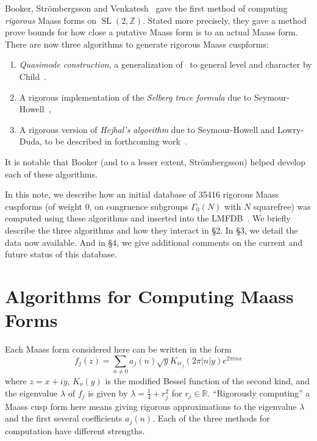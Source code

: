 \documentclass[11pt,reqno,oneside]{amsart}
\theoremstyle{plain}
\theoremstyle{definition}
\DeclareMathOperator{\SL}{SL}
\begin{document}
Booker, Str\"ombergsson and Venkatesh~\cite{booker2006effective} gave the first
method of computing \emph{rigorous} Maass forms on $\SL(2, \mathbb{Z})$.
Stated more precisely, they gave a method prove bounds for how close a putative
Maass form is to an actual Maass form.
There are now three algorithms to generate rigorous Maass cuspforms:
\begin{enumerate}
  \item \emph{Quasimode construction}, a generalization
  of~\cite{booker2006effective} to general level and character by
  Child~\cite{child22}.
  \item A rigorous implementation of the \emph{Selberg trace formula} due to
  Seymour-Howell~\cite{seymour2022rigorous},
  \item A rigorous version of \emph{Hejhal's algorithm} due to Seymour-Howell
  and Lowry-Duda, to be described in forthcoming work~\cite{ldshHejhal}.
\end{enumerate}
It is notable that Booker (and to a lesser extent, Str\"ombergsson) helped
develop each of these algorithms.

In this note, we describe how an initial database of 35416 rigorous Maass
cuspforms (of weight $0$, on congruence subgroups $\Gamma_0(N)$ with $N$
squarefree) was computed using these algorithms and inserted into the
LMFDB~\cite{lmfdb}.
We briefly describe the three algorithms and how they interact in \S2.
In \S3, we detail the data now available.
And in \S4, we give additional comments on the current and future status of
this database.


\section{Algorithms for Computing Maass Forms}\label{sec:algorithms}

Each Maass form considered here can be written in the form
\begin{equation}\label{eq:maass_expansion}
  f_j(z)
  =
  \sum_{n \neq 0}
  a_j(n) \sqrt{y} K_{i{r_j}}(2 \pi \lvert n \rvert y) e^{2 \pi i n x}
\end{equation}
where $z = x + iy$, $K_\nu(y)$ is the modified Bessel function of the second
kind, and the eigenvalue $\lambda$ of $f_j$ is given by $\lambda = \frac{1}{4}
+ r_j^2$ for $r_j \in \mathbb{R}$.
``Rigorously computing'' a Maass cusp form here means giving rigorous
approximations to the eigenvalue $\lambda$ and the first several coefficients
$a_j(n)$.
Each of the three methods for computation have different strengths.
\end{document}
